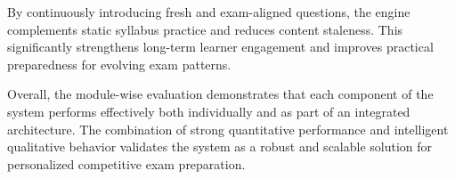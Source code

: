 \begin{sloppypar}
By continuously introducing fresh and exam-aligned questions, the engine complements static syllabus practice and reduces content staleness. This significantly strengthens long-term learner engagement and improves practical preparedness for evolving exam patterns.

Overall, the module-wise evaluation demonstrates that each component of the system performs effectively both individually and as part of an integrated architecture. The combination of strong quantitative performance and intelligent qualitative behavior validates the system as a robust and scalable solution for personalized competitive exam preparation.

\end{sloppypar}